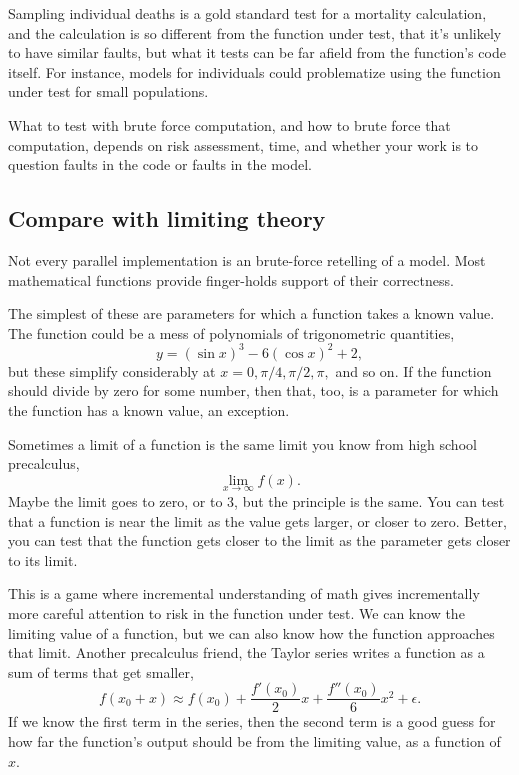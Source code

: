 \documentclass[fleqn,10pt]{olplainarticle}
\begin{document}
Sampling individual deaths is a gold standard test for a mortality
calculation, and the calculation is so different from the 
function under test, that it's unlikely to have similar faults,
but what it tests can be far afield from the function's code itself.
For instance, models for individuals could problematize using
the function under test for small populations.

What to test with brute force computation, and how to brute
force that computation, depends on risk assessment, time, and
whether your work is to question faults in the code or faults
in the model.



\subsection{Compare with limiting theory}\label{sec:limits}

Not every parallel implementation is an brute-force retelling
of a model. Most mathematical functions provide finger-holds
support of their correctness.

The simplest of these are parameters for which a function
takes a known value. The function could be a mess of
polynomials of trigonometric quantities,
\begin{equation}
  y = (\sin x)^3 - 6 (\cos x)^2 + 2,
\end{equation}
but these simplify considerably at $x=0, \pi/4, \pi/2, \pi,$
and so on. If the function should divide by zero for some
number, then that, too, is a parameter for which the function
has a known value, an exception.

Sometimes a limit of a function is the same limit you know
from high school precalculus,
\begin{equation}
  \lim_{x\rightarrow\infty} f(x).
\end{equation}
Maybe the limit goes to zero, or to 3, but the principle is
the same. You can test that a function is near the limit
as the value gets larger, or closer to zero. Better, you can
test that the function gets closer to the limit as the
parameter gets closer to its limit.

This is a game where incremental understanding of math
gives incrementally more careful attention to risk in the
function under test. We can know the limiting value of a
function, but we can also know how the function approaches
that limit. Another precalculus friend, the Taylor series
writes a function as a sum of terms that get smaller,
\begin{equation}
  f(x_0+x) \approx f(x_0) + \frac{f'(x_0)}{2}x + \frac{f''(x_0)}{6}x^2 + \epsilon.
\end{equation}
If we know the first term in the series, then the second term
is a good guess for how far the function's output should be from
the limiting value, as a function of $x$.
\end{document}
